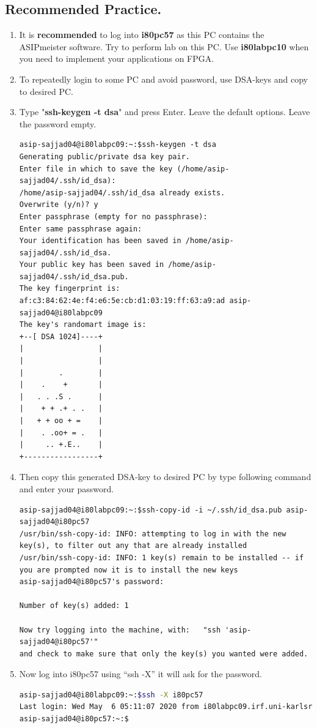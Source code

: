 \subsection{Recommended Practice.}
\begin{enumerate}[resume]
\item It is \textbf{recommended} to log into \textbf{i80pc57} as this PC contains the ASIPmeister software. Try to perform lab on this PC. Use \textbf{i80labpc10} when you need to implement your applications on FPGA.
\item To repeatedly login to some PC and avoid password, use DSA-keys and copy to desired PC.
\item Type "\textbf{ssh-keygen -t dsa}" and press Enter. Leave the default options. Leave the password empty.
\begin{lstlisting}
asip-sajjad04@i80labpc09:~:$ssh-keygen -t dsa
Generating public/private dsa key pair.
Enter file in which to save the key (/home/asip-sajjad04/.ssh/id_dsa):
/home/asip-sajjad04/.ssh/id_dsa already exists.
Overwrite (y/n)? y
Enter passphrase (empty for no passphrase):
Enter same passphrase again:
Your identification has been saved in /home/asip-sajjad04/.ssh/id_dsa.
Your public key has been saved in /home/asip-sajjad04/.ssh/id_dsa.pub.
The key fingerprint is:
af:c3:84:62:4e:f4:e6:5e:cb:d1:03:19:ff:63:a9:ad asip-sajjad04@i80labpc09
The key's randomart image is:
+--[ DSA 1024]----+
|                 |
|                 |
|        .        |
|    .    +       |
|   . . .S .      |
|    + + .+ . .   |
|   + + oo + =    |
|    . .oo+ = .   |
|     .. +.E..    |
+-----------------+
\end{lstlisting}
\item Then copy this generated DSA-key to desired PC by type following command and enter your password.
\begin{lstlisting}
asip-sajjad04@i80labpc09:~:$ssh-copy-id -i ~/.ssh/id_dsa.pub asip-sajjad04@i80pc57
/usr/bin/ssh-copy-id: INFO: attempting to log in with the new key(s), to filter out any that are already installed
/usr/bin/ssh-copy-id: INFO: 1 key(s) remain to be installed -- if you are prompted now it is to install the new keys
asip-sajjad04@i80pc57's password:

Number of key(s) added: 1

Now try logging into the machine, with:   "ssh 'asip-sajjad04@i80pc57'"
and check to make sure that only the key(s) you wanted were added.
\end{lstlisting}
\item Now log into i80pc57 using ``ssh -X'' it will ask for the password.
\begin{lstlisting}[language=bash]
asip-sajjad04@i80labpc09:~:$ssh -X i80pc57
Last login: Wed May  6 05:11:07 2020 from i80labpc09.irf.uni-karlsruhe.de
asip-sajjad04@i80pc57:~:$
\end{lstlisting}
\end{enumerate}
